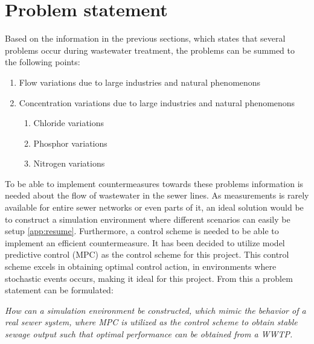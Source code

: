 \newpage
\section{Problem statement}
\label{sec:problem_statement}

Based on the information in the previous sections, which states that several problems occur during wastewater treatment, the problems can be summed to the following points:

\begin{enumerate}
\item Flow variations due to large industries and natural phenomenons
\item Concentration variations due to large industries and natural phenomenons
\begin{enumerate}
	\item Chloride variations
	\item Phosphor variations
	\item Nitrogen variations
\end{enumerate}
\end{enumerate}

To be able to implement countermeasures towards these problems information is needed about the flow of wastewater in the sewer lines. As measurements is rarely available for entire sewer networks or even parts of it, an ideal solution would be to construct a simulation environment where different scenarios can easily be setup \ref{app:resume}. Furthermore, a control scheme is needed to be able to implement an efficient countermeasure. It has been decided to utilize model predictive control (MPC) as the control scheme for this project. This control scheme excels in obtaining optimal control action, in environments where stochastic events occurs, making it ideal for this project.
From this a problem statement can be formulated: \\
\begin{center}
\textit{How can a simulation environment be constructed, which mimic the behavior of a real sewer system, where MPC is utilized as the control scheme to obtain stable sewage output such that optimal performance can be obtained from a WWTP.}
\end{center}